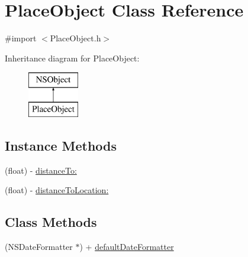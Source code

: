 \hypertarget{interface_place_object}{}\section{Place\+Object Class Reference}
\label{interface_place_object}


{\ttfamily \#import $<$Place\+Object.\+h$>$}

Inheritance diagram for Place\+Object\+:\begin{figure}[H]
\begin{center}
\leavevmode
\includegraphics[height=2.000000cm]{interface_place_object}
\end{center}
\end{figure}
\subsection*{Instance Methods}
\begin{DoxyCompactItemize}
\item 
(float) -\/ \hyperlink{interface_place_object_ae70795d19e922fa47c73e2ae5c56a3f1}{distance\+To\+:}
\item 
(float) -\/ \hyperlink{interface_place_object_af0f61112b3f32da19ad6fcb8ceb01250}{distance\+To\+Location\+:}
\end{DoxyCompactItemize}
\subsection*{Class Methods}
\begin{DoxyCompactItemize}
\item 
(N\+S\+Date\+Formatter $\ast$) + \hyperlink{interface_place_object_a8d9cb68c1b4f3059c051b022f6c672e0}{default\+Date\+Formatter}
\end{DoxyCompactItemize}
